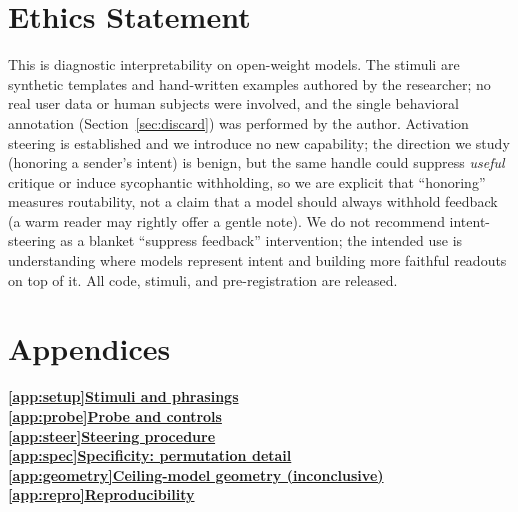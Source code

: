 \documentclass[11pt]{article}
\begin{document}
\section*{Ethics Statement}
This is diagnostic interpretability on open-weight models. The stimuli are synthetic templates and hand-written
examples authored by the researcher; no real user data or human subjects were involved, and the single
behavioral annotation (Section~\ref{sec:discard}) was performed by the author. Activation steering is
established and we introduce no new capability; the direction we study (honoring a sender's intent) is benign,
but the same handle could suppress \emph{useful} critique or induce sycophantic withholding, so we are explicit
that ``honoring'' measures routability, not a claim that a model should always withhold feedback (a warm reader
may rightly offer a gentle note). We do not recommend intent-steering as a blanket ``suppress feedback''
intervention; the intended use is understanding where models represent intent and building more faithful
readouts on top of it. All code, stimuli, and pre-registration are released.



\appendix
\onecolumn

\section*{\Large Appendices}
\vspace{0.4em}
{\noindent
\hyperref[app:setup]{\textcolor{tocblue}{\textbf{\ref*{app:setup}\hspace{1.5em}Stimuli and phrasings}}}\dotfill \textbf{\pageref*{app:setup}}\\[5pt]
\hyperref[app:probe]{\textcolor{tocblue}{\textbf{\ref*{app:probe}\hspace{1.5em}Probe and controls}}}\dotfill \textbf{\pageref*{app:probe}}\\[5pt]
\hyperref[app:steer]{\textcolor{tocblue}{\textbf{\ref*{app:steer}\hspace{1.5em}Steering procedure}}}\dotfill \textbf{\pageref*{app:steer}}\\[5pt]
\hyperref[app:spec]{\textcolor{tocblue}{\textbf{\ref*{app:spec}\hspace{1.5em}Specificity: permutation detail}}}\dotfill \textbf{\pageref*{app:spec}}\\[5pt]
\hyperref[app:geometry]{\textcolor{tocblue}{\textbf{\ref*{app:geometry}\hspace{1.5em}Ceiling-model geometry (inconclusive)}}}\dotfill \textbf{\pageref*{app:geometry}}\\[5pt]
\hyperref[app:repro]{\textcolor{tocblue}{\textbf{\ref*{app:repro}\hspace{1.5em}Reproducibility}}}\dotfill \textbf{\pageref*{app:repro}}\\[5pt]
}
\vspace{0.4em}
\end{document}
